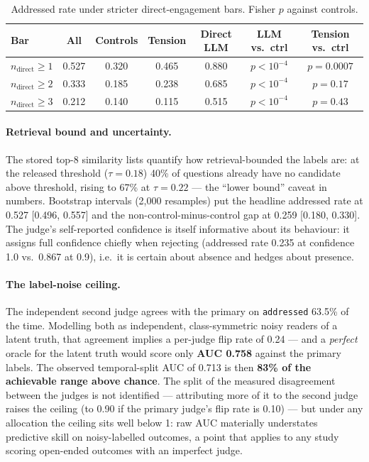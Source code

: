 \documentclass[11pt]{article}
\begin{document}
\begin{table}[htbp]
  \centering
  \caption{Addressed rate under stricter direct-engagement bars. Fisher
  $p$ against controls.}
  \label{tab:bars}
  \small
  \begin{tabular}{lcccccc}
    \toprule
    Bar & All & Controls & Tension & Direct LLM & LLM vs.\ ctrl & Tension vs.\ ctrl \\
    \midrule
    $n_\mathrm{direct}\geq 1$ & 0.527 & 0.320 & 0.465 & 0.880 & $p<10^{-4}$ & $p=0.0007$ \\
    $n_\mathrm{direct}\geq 2$ & 0.333 & 0.185 & 0.238 & 0.685 & $p<10^{-4}$ & $p=0.17$ \\
    $n_\mathrm{direct}\geq 3$ & 0.212 & 0.140 & 0.115 & 0.515 & $p<10^{-4}$ & $p=0.43$ \\
    \bottomrule
  \end{tabular}
\end{table}

\paragraph{Retrieval bound and uncertainty.} The stored top-8 similarity
lists quantify how retrieval-bounded the labels are: at the released
threshold ($\tau=0.18$) 40\% of questions already have no candidate above
threshold, rising to 67\% at $\tau=0.22$ --- the ``lower bound'' caveat in
numbers. Bootstrap intervals (2{,}000 resamples) put the headline
addressed rate at 0.527 [0.496, 0.557] and the non-control-minus-control
gap at 0.259 [0.180, 0.330]. The judge's self-reported confidence is
itself informative about its behaviour: it assigns full confidence chiefly
when rejecting (addressed rate 0.235 at confidence 1.0 vs.\ 0.867 at 0.9),
i.e.\ it is certain about absence and hedges about presence.

\paragraph{The label-noise ceiling.} The independent second judge agrees
with the primary on \texttt{addressed} 63.5\% of the time. Modelling both
as independent, class-symmetric noisy readers of a latent truth, that
agreement implies a per-judge flip rate of 0.24 --- and a \emph{perfect}
oracle for the latent truth would score only \textbf{AUC 0.758} against
the primary labels. The observed temporal-split AUC of 0.713 is then
\textbf{83\% of the achievable range above chance}. The split of the
measured disagreement between the judges is not identified --- attributing
more of it to the second judge raises the ceiling (to 0.90 if the primary
judge's flip rate is 0.10) --- but under any allocation the ceiling sits
well below 1: raw AUC materially understates predictive skill on
noisy-labelled outcomes, a point that applies to any study scoring
open-ended outcomes with an imperfect judge.
\end{document}
